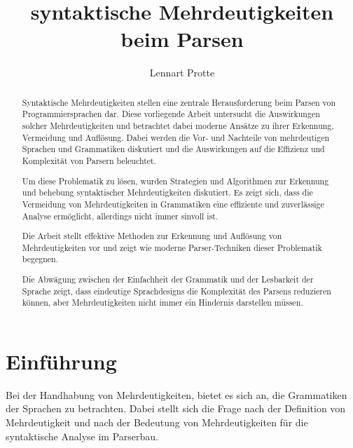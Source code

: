 \documentclass[runningheads]{llncs}
\begin{document}
%
	\title{syntaktische Mehrdeutigkeiten beim Parsen}
%
%
	\author{Lennart Protte}
%
%
%
	\maketitle              %
%
	\begin{abstract}
		Syntaktische Mehrdeutigkeiten stellen eine zentrale Herausforderung beim Parsen von Programmiersprachen dar.
		Diese vorliegende Arbeit untersucht die Auswirkungen solcher Mehrdeutigkeiten
		und betrachtet dabei moderne Ansätze zu ihrer Erkennung, Vermeidung und Auflösung.
		Dabei werden die Vor- und Nachteile von mehrdeutigen Sprachen und Grammatiken diskutiert
		und die Auswirkungen auf die Effizienz und Komplexität von Parsern beleuchtet.

		Um diese Problematik zu lösen,
		wurden Strategien und Algorithmen zur Erkennung und behebung syntaktischer Mehrdeutigkeiten diskutiert.
		Es zeigt sich, dass die Vermeidung von Mehrdeutigkeiten in Grammatiken eine effiziente und zuverlässige Analyse ermöglicht,
		allerdings nicht immer sinvoll ist.

		Die Arbeit stellt effektive Methoden zur Erkennung und Auflösung von Mehrdeutigkeiten vor
		und zeigt wie moderne Parser-Techniken dieser Problematik begegnen.

		Die Abwägung zwischen der Einfachheit der Grammatik und der Lesbarkeit der Sprache zeigt,
		dass eindeutige Sprachdesigns die Komplexität des Parsens reduzieren können,
		aber Mehrdeutigkeiten nicht immer ein Hindernis darstellen müssen.

	\end{abstract}


	\section{Einführung}\label{sec:einfuhrung}
	Bei der Handhabung von Mehrdeutigkeiten, bietet es sich an, die Grammatiken der Sprachen zu betrachten.
	Dabei stellt sich die Frage nach der Definition von Mehrdeutigkeit
	und nach der Bedeutung von Mehrdeutigkeiten für die syntaktische Analyse im Parserbau.
\end{document}
